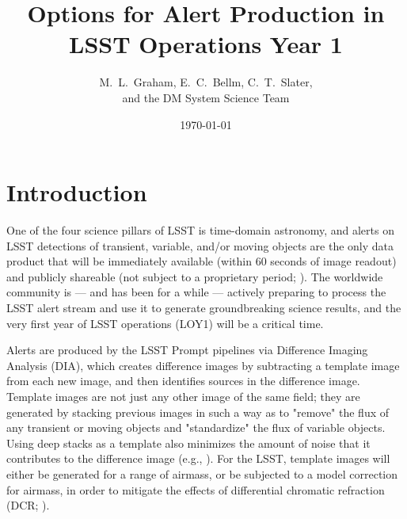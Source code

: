 \documentclass[DM,lsstdraft,toc]{lsstdoc}
\title[Alert Production in Year 1]{Options for Alert Production in \\ LSST Operations Year 1}
\author{M.~L.~Graham, E.~C.~Bellm, C.~T.~Slater, \\ and the DM System Science Team}
\date{\today}
\begin{document}
\maketitle


\section{Introduction} \label{sec:intro}

One of the four science pillars of LSST is time-domain astronomy, and alerts on LSST detections of transient, variable, and/or moving objects are the only data product that will be immediately available (within $60$ seconds of image readout) and publicly shareable (not subject to a proprietary period; ). The worldwide community is --- and has been for a while --- actively preparing to process the LSST alert stream and use it to generate groundbreaking science results, and the very first year of LSST operations (LOY1) will be a critical time. %

Alerts are produced by the LSST Prompt pipelines via Difference Imaging Analysis (DIA), which creates difference images by subtracting a template image from each new image, and then identifies sources in the difference image. Template images are not just any other image of the same field; they are generated by stacking previous images in such a way as to "remove" the flux of any transient or moving objects and "standardize" the flux of variable objects. Using deep stacks as a template also minimizes the amount of noise that it contributes to the difference image (e.g., ). For the LSST, template images will either be generated for a range of airmass, or be subjected to a model correction for airmass, in order to mitigate the effects of differential chromatic refraction (DCR; ).
\end{document}
